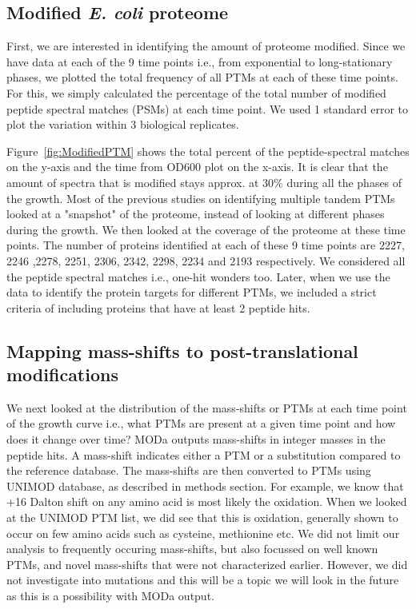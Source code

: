 \documentclass[12pt]{article}
\begin{document}
\subsection{Modified \emph{E. coli} proteome}
First, we are interested in identifying the amount of proteome modified. Since we have data at each of the 9 time points i.e., from exponential to long-stationary phases, we plotted the total frequency of all PTMs at each of these time points. For this, we simply calculated the percentage of the total number of modified peptide spectral matches (PSMs) at each time point. We used 1 standard error to plot the variation within 3 biological replicates.

Figure~\ref{fig:ModifiedPTM} shows the total percent of the peptide-spectral matches on the y-axis and the time from OD600 plot on the x-axis. It is clear that the amount of spectra that is modified stays approx. at 30\% during all the phases of the growth. Most of the previous studies on identifying multiple tandem PTMs looked at a "snapshot" of the proteome, instead of looking at different phases during the growth. We then looked at the coverage of the proteome at these time points. The number of proteins identified at each of these 9 time points are 2227, 2246
,2278, 2251, 2306, 2342, 2298, 2234 and 2193 respectively. We considered all the peptide spectral matches i.e., one-hit wonders too. Later, when we use the data to identify the protein targets for different PTMs, we included a strict criteria of including proteins that have at least 2 peptide hits.

\subsection{Mapping mass-shifts to post-translational modifications}

We next looked at the distribution of the mass-shifts or PTMs at each time point of the growth curve i.e., what PTMs are present at a given time point and how does it change over time? MODa outputs mass-shifts in integer masses in the peptide hits. A mass-shift indicates either a PTM or a substitution compared to the reference database. The mass-shifts are then converted to PTMs using UNIMOD database, as described in methods section. For example, we know that +16 Dalton shift on any amino acid is most likely the oxidation. When we looked at the UNIMOD PTM list, we did see that this is oxidation, generally shown to occur on few amino acids such as cysteine, methionine etc. We did not limit our analysis to frequently occuring mass-shifts, but also focussed on well known PTMs, and novel mass-shifts that were not characterized earlier. However, we did not investigate into mutations and this will be a topic we will look in the future as this is a possibility with MODa output.
\end{document}

